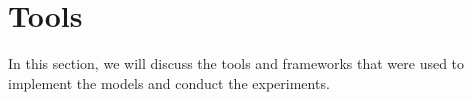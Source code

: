 \chapter{Tools}



In this section, we will discuss the tools and frameworks that were used to implement the models and conduct the experiments.





